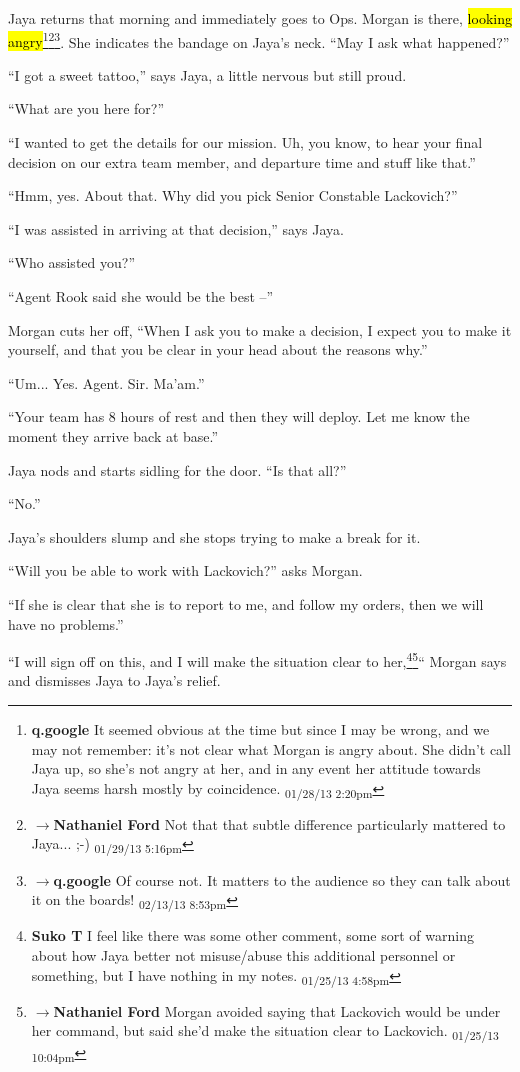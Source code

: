 Jaya returns that morning and immediately goes to Ops.  Morgan is there, \hl{looking angry}\footnote{\textbf{q.google }It seemed obvious at the time but since I may be wrong, and we may not remember: it's not clear what Morgan is angry about.  She didn't call Jaya up, so she's not angry at her, and in any event her attitude towards Jaya seems harsh mostly by coincidence. \textsubscript{01/28/13 2:20pm}}\footnote{$\rightarrow$\textbf{Nathaniel Ford }Not that that subtle difference particularly mattered to Jaya... ;-) \textsubscript{01/29/13 5:16pm}}\footnote{$\rightarrow$\textbf{q.google }Of course not.  It matters to the audience so they can talk about it on the boards! \textsubscript{02/13/13 8:53pm}}.  She indicates the bandage on Jaya's neck. ``May I ask what happened?''

``I got a sweet tattoo,'' says Jaya, a little nervous but still proud.

``What are you here for?''

``I wanted to get the details for our mission.  Uh, you know, to hear your final decision on our extra team member, and departure time and stuff like that.''

``Hmm, yes.  About that.  Why did you pick Senior Constable Lackovich?''

``I was assisted in arriving at that decision,'' says Jaya.

``Who assisted you?''

``Agent Rook said she would be the best --''

Morgan cuts her off, ``When I ask you to make a decision, I expect you to make it yourself, and that you be clear in your head about the reasons why.''

``Um... Yes.  Agent.  Sir.  Ma'am.''

``Your team has 8 hours of rest and then they will deploy.  Let me know the moment they arrive back at base.''

Jaya nods and starts sidling for the door.  ``Is that all?''

``No.''

Jaya's shoulders slump and she stops trying to make a break for it.

``Will you be able to work with Lackovich?'' asks Morgan.

``If she is clear that she is to report to me, and follow my orders, then we will have no problems.''

``I will sign off on this, and I will make the situation clear to her,\footnote{\textbf{Suko T }I feel like there was some other comment, some sort of warning about how Jaya better not misuse/abuse this additional personnel or something, but I have nothing in my notes. \textsubscript{01/25/13 4:58pm}}\footnote{$\rightarrow$\textbf{Nathaniel Ford }Morgan avoided saying that Lackovich would be under her command, but said she'd make the situation clear to Lackovich. \textsubscript{01/25/13 10:04pm}}``  Morgan says and dismisses Jaya to Jaya's relief.



